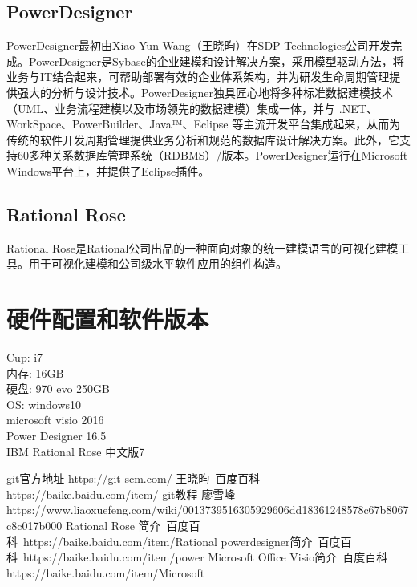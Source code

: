 \documentclass{article}
\begin{document}
	\subsection{PowerDesigner}
	PowerDesigner最初由Xiao-Yun Wang（王晓昀）在SDP Technologies公司开发完成。PowerDesigner是Sybase的企业建模和设计解决方案，采用模型驱动方法，将业务与IT结合起来，可帮助部署有效的企业体系架构，并为研发生命周期管理提供强大的分析与设计技术。PowerDesigner独具匠心地将多种标准数据建模技术（UML、业务流程建模以及市场领先的数据建模）集成一体，并与 .NET、WorkSpace、PowerBuilder、Java™、Eclipse 等主流开发平台集成起来，从而为传统的软件开发周期管理提供业务分析和规范的数据库设计解决方案。此外，它支持60多种关系数据库管理系统（RDBMS）/版本。PowerDesigner运行在Microsoft Windows平台上，并提供了Eclipse插件。
	\subsection{Rational Rose}
	Rational Rose是Rational公司出品的一种面向对象的统一建模语言的可视化建模工具。用于可视化建模和公司级水平软件应用的组件构造。
	\section{硬件配置和软件版本}
	Cup:  i7\\
	内存: 16GB\\
	硬盘: 970 evo 250GB\\
	OS: windows10\\
	microsoft visio 2016\\
	Power Designer 16.5\\
	IBM Rational Rose 中文版7\\
	\begin{thebibliography}{99}
		\bibitem{}git官方地址 https://git-scm.com/
		\bibitem{}王晓昀\ 百度百科 https://baike.baidu.com/item/%
		\bibitem{}git教程 廖雪峰
		\\ https://www.liaoxuefeng.com/wiki/0013739516305929606dd18361248578c67b8067c8c017b000
		\bibitem{}Rational Rose 简介\ 百度百科\ https://baike.baidu.com/item/Rational%
		\bibitem{}powerdesigner简介\ 百度百科\ https://baike.baidu.com/item/power%
		\bibitem{}Microsoft Office Visio简介\ 百度百科 \\ https://baike.baidu.com/item/Microsoft%
		
	\end{thebibliography}
\end{document}
